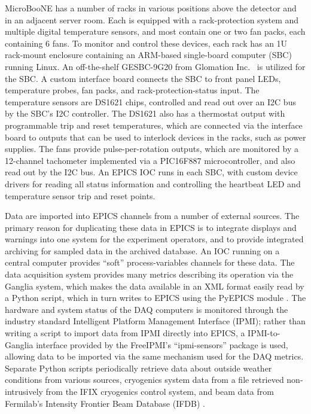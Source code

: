 MicroBooNE has a number of racks in various positions above the detector and in an adjacent server room.  Each is equipped with a rack-protection system and multiple digital temperature sensors, and most contain one or two fan packs, each containing 6 fans.  To monitor and control these devices, each rack has an 1U rack-mount enclosure containing an ARM-based single-board computer (SBC) running Linux.  An off-the-shelf GESBC-9G20 from Glomation Inc.~\cite{GlomationInc} is utilized for the SBC.  A custom interface board \cite{HuffmanFanInterfacePage} connects the SBC to front panel LEDs, temperature probes, fan packs, and rack-protection-status input. The temperature sensors are DS1621 chips, controlled and read out over an I2C bus by the SBC's I2C controller.  The DS1621 also has a thermostat output with programmable trip and reset temperatures, which are connected via the interface board to outputs that can be used to interlock devices in the racks, such as power supplies.  The fans provide pulse-per-rotation outputs, which are monitored by a 12-channel tachometer implemented via a PIC16F887 microcontroller, and also read out by the I2C bus.  An EPICS IOC runs in each SBC, with custom device drivers for reading all status information and controlling the heartbeat LED and temperature sensor trip and reset points.


Data are imported into EPICS channels from a number of external sources. The primary reason for duplicating these data in EPICS is to integrate displays and warnings into one system for the experiment operators, and to provide integrated archiving for sampled data in the archived database. An IOC running on a central computer provides ``soft'' process-variables channels for these data.  The data acquisition system provides many metrics describing its operation via the Ganglia system\cite{GangliaBook,GangliaHomePage}, which makes the data available in an XML format easily read by a Python script, which in turn writes to EPICS using the PyEPICS module \cite{PyEPICS}.  The hardware and system status of the DAQ computers is monitored through the industry standard Intelligent Platform Management Interface (IPMI); rather than writing a script to import data from IPMI directly into EPICS, a IPMI-to-Ganglia interface provided by the FreeIPMI's ``ipmi-sensors'' package \cite{FreeIPMI} is used, allowing data to be imported via the same mechanism used for the DAQ metrics.  Separate Python scripts periodically retrieve data about outside weather conditions from various sources, cryogenics system data from a file retrieved non-intrusively from the IFIX cryogenics control system, and beam data from Fermilab's Intensity Frontier Beam Database (IFDB) \cite{IFBeamDB}. 

